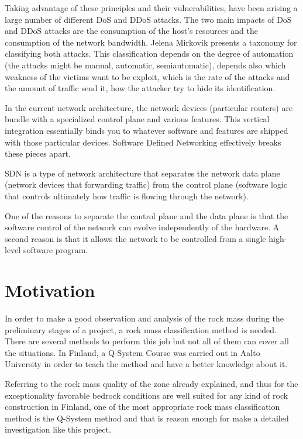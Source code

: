 \bigskip
Taking advantage of these principles and their vulnerabilities, have been arising a large number of different DoS and DDoS attacks. The two main impacts of DoS and DDoS attacks are the consumption of the host's resources and the consumption of the network bandwidth. Jelena Mirkovik presents a taxonomy for classifying both attacks. This classification depends on the degree of automation (the attacks might be manual, automatic, semiautomatic), depends also which weakness of the victims want to be exploit, which is the rate of the attacks and the amount of traffic send it, how the attacker try to hide its identification.


In the current network architecture, the network devices (particular routers) are bundle with a specialized control plane and various features. This vertical integration essentially binds you to whatever software and features are shipped with those particular devices. Software Defined Networking effectively breaks these pieces apart.

SDN is a type of network architecture that separates the network data plane (network devices that forwarding traffic) from the control plane (software logic that controls ultimately how traffic is flowing through the network).  

One of the reasons to separate the control plane and the data plane is that the software control of the network can evolve independently of the hardware. A second reason is that it allows the network to be controlled from a single high-level software program.

\section{Motivation}

In order to make a good observation and analysis of the rock mass during the preliminary stages of a project, a rock mass classification method is needed. There are several methods to perform this job but not all of them can cover all the situations. In Finland, a Q-System Course was carried out in Aalto University in order to teach the method and have a better knowledge about it. 

Referring to the rock mass quality of the zone already explained, and thus for the exceptionality favorable bedrock conditions are well suited for any kind of rock construction in Finland, one of the most appropriate rock mass classification method is the Q-System method and that is reason enough for make a detailed investigation like this project.


